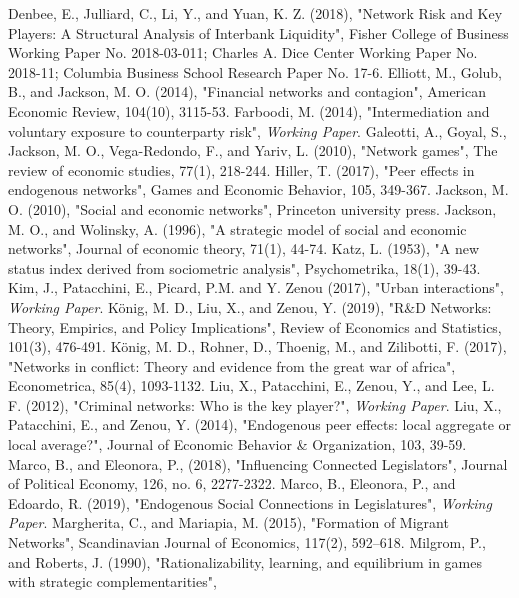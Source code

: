 \documentclass[12pt]{article}
\theoremstyle{definition}
\begin{document}
\begin{thebibliography}{99}
\bibitem{}
	Denbee, E., Julliard, C., Li, Y., and Yuan, K. Z. (2018),
	"Network Risk and Key Players: A Structural Analysis of Interbank Liquidity",
	Fisher College of Business Working Paper No. 2018-03-011;
	Charles A. Dice Center Working Paper No. 2018-11;
	Columbia Business School Research Paper No. 17-6. 
	Elliott, M., Golub, B., and Jackson, M. O. (2014),
	"Financial networks and contagion",
	American Economic Review, 104(10), 3115-53.
	Farboodi, M. (2014),
	"Intermediation and voluntary exposure to counterparty risk",
	\textit{Working Paper}.
\bibitem{}
	Galeotti, A., Goyal, S., Jackson, M. O., Vega-Redondo, F., and Yariv, L. (2010),
	"Network games",
	The review of economic studies, 77(1), 218-244.
	Hiller, T. (2017),
	"Peer effects in endogenous networks",
	Games and Economic Behavior, 105, 349-367.
	Jackson, M. O. (2010),
	"Social and economic networks",
	Princeton university press.
\bibitem{}
	Jackson, M. O., and Wolinsky, A. (1996),
	"A strategic model of social and economic networks",
	Journal of economic theory, 71(1), 44-74.
	Katz, L. (1953),
	"A new status index derived from sociometric analysis",
	Psychometrika, 18(1), 39-43.
	Kim, J., Patacchini, E., Picard, P.M. and Y. Zenou (2017),
	"Urban interactions",
	\textit{Working Paper}.
\bibitem{}
	K\"{o}nig, M. D., Liu, X., and Zenou, Y. (2019),
	"R\&D Networks: Theory, Empirics, and Policy Implications",
	Review of Economics and Statistics, 101(3), 476-491.
\bibitem{}
	K\"{o}nig, M. D., Rohner, D., Thoenig, M., and Zilibotti, F. (2017),
	"Networks in conflict: Theory and evidence from the great war of africa",
	Econometrica, 85(4), 1093-1132.
	Liu, X., Patacchini, E., Zenou, Y., and Lee, L. F. (2012),
	"Criminal networks: Who is the key player?",
	\textit{Working Paper}.
\bibitem{}
	Liu, X., Patacchini, E., and Zenou, Y. (2014),
	"Endogenous peer effects: local aggregate or local average?",
	Journal of Economic Behavior \& Organization, 103, 39-59.
\bibitem{}
	Marco, B., and Eleonora, P., (2018),
	"Influencing Connected Legislators",
	Journal of Political Economy, 126, no. 6, 2277-2322.
\bibitem{}
	Marco, B., Eleonora, P., and Edoardo, R. (2019),
	"Endogenous Social Connections in Legislatures",
	\textit{Working Paper}.
\bibitem{}
	Margherita, C., and Mariapia, M. (2015),
	"Formation of Migrant  Networks",
	Scandinavian Journal of Economics, 117(2), 592–618.
	Milgrom, P., and Roberts, J. (1990),
	"Rationalizability, learning, and equilibrium in games with strategic complementarities",

\end{thebibliography}
\end{document}
